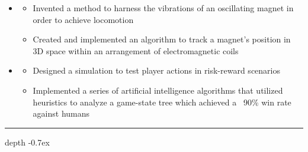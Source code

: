 \documentclass[10pt,letterpaper]{article}
\def\Vhrulefill{\leavevmode\leaders\hrule height 0.7ex depth \dimexpr0.4pt-0.7ex\hfill\kern0pt}
\begin{document}
\begin{itemize}[label={}]
 \item \small{ \hfill {}}
 \vspace{-1.58mm}
 \begin{itemize}[label={}]
 	\item \small{Invented a method to harness the vibrations of an oscillating magnet in order to achieve locomotion}
 	\item \small{Created and implemented an algorithm to track a magnet's position in 3D space within an arrangement of electromagnetic coils}
 \end{itemize}

 \item \small{ \hfill {}}
 \vspace{-1.58mm}
 \begin{itemize}[label={}]
 	\item \small{Designed a simulation to test player actions in risk-reward scenarios}
 	\item \small{Implemented a series of artificial intelligence algorithms that utilized heuristics to analyze a game-state tree which achieved a ~90\% win rate against humans}
 \end{itemize}
\end{itemize}




%
%


\vspace{-.78mm}
\noindent \large{}  \Vhrulefill
\vspace{-.7mm}
\end{document}
